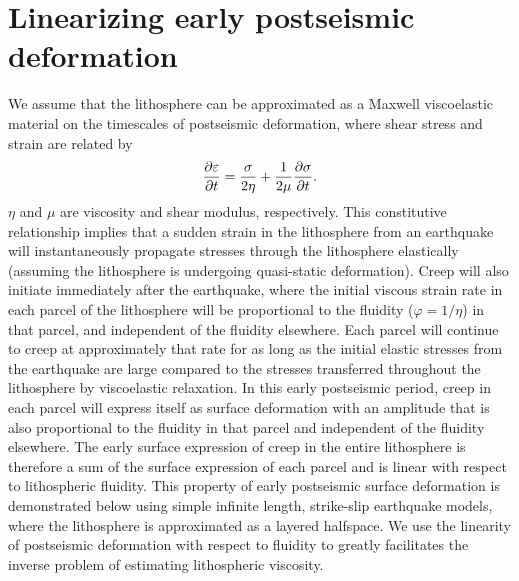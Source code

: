 \documentclass[fleqn,12pt]{article}
\begin{document}
\section{Linearizing early postseismic deformation} 
We assume that the lithosphere can be approximated as a Maxwell
viscoelastic material on the timescales of postseismic deformation,
where shear stress and strain are related by
\begin{equation}
  \frac{\partial\bold{\varepsilon}}{\partial t}=\frac{\bold{\sigma}}{2\eta} + 
                              \frac{1}{2\mu}\frac{\partial\bold{\sigma}}{\partial t}.
\end{equation}
$\eta$ and $\mu$ are viscosity and shear modulus, respectively.  This
constitutive relationship implies that a sudden strain in the
lithosphere from an earthquake will instantaneously propagate stresses
through the lithosphere elastically (assuming the lithosphere is
undergoing quasi-static deformation).  Creep will also initiate
immediately after the earthquake, where the initial viscous strain
rate in each parcel of the lithosphere will be proportional to the
fluidity ($\varphi=1/\eta$) in that parcel, and independent of the
fluidity elsewhere.  Each parcel will continue to creep at
approximately that rate for as long as the initial elastic stresses
from the earthquake are large compared to the stresses transferred
throughout the lithosphere by viscoelastic relaxation.  In this early
postseismic period, creep in each parcel will express itself as
surface deformation with an amplitude that is also proportional to the
fluidity in that parcel and independent of the fluidity elsewhere.
The early surface expression of creep in the entire lithosphere is
therefore a sum of the surface expression of each parcel and is linear
with respect to lithospheric fluidity.  This property of early
postseismic surface deformation is demonstrated below using simple
infinite length, strike-slip earthquake models, where the lithosphere
is approximated as a layered halfspace.  We use the linearity of
postseismic deformation with respect to fluidity to greatly
facilitates the inverse problem of estimating lithospheric viscosity.
\end{document}
